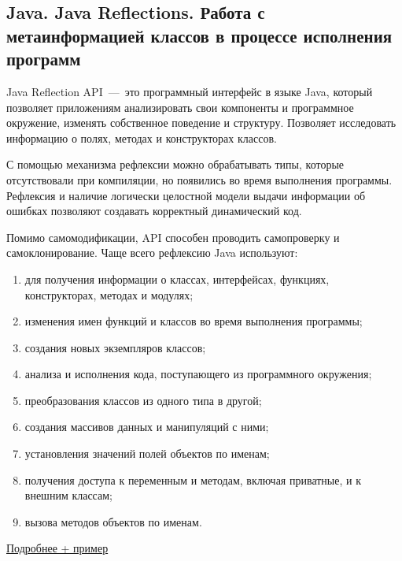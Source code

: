 \subsection{Java. Java Reflections. Работа с метаинформацией классов в процессе исполнения программ}

Java Reflection API~---~это программный интерфейс в языке Java, который позволяет приложениям анализировать свои компоненты и программное окружение, изменять собственное поведение и структуру. Позволяет исследовать информацию о полях, методах и конструкторах классов.

С помощью механизма рефлексии можно обрабатывать типы, которые отсутствовали при компиляции, но появились во время выполнения программы. Рефлексия и наличие логически целостной модели выдачи информации об ошибках позволяют создавать корректный динамический код. 

Помимо самомодификации, API способен проводить самопроверку и самоклонирование. Чаще всего рефлексию Java используют:
\begin{enumerate}
	\item для получения информации о классах, интерфейсах, функциях, конструкторах, методах и модулях;
	\item изменения имен функций и классов во время выполнения программы;
	\item создания новых экземпляров классов;
	\item анализа и исполнения кода, поступающего из программного окружения;
	\item преобразования классов из одного типа в другой;
	\item создания массивов данных и манипуляций с ними;
	\item установления значений полей объектов по именам;
	\item получения доступа к переменным и методам, включая приватные, и к внешним классам;
	\item вызова методов объектов по именам.
\end{enumerate}
\href{https://blog.skillfactory.ru/glossary/java-reflection-api/#:~:text=Java%20Reflection%20API%20%E2%80%94%20%D1%8D%D1%82%D0%BE%20%D0%BF%D1%80%D0%BE%D0%B3%D1%80%D0%B0%D0%BC%D0%BC%D0%BD%D1%8B%D0%B9,%D0%BF%D0%BE%D0%BB%D1%8F%D1%85%2C%20%D0%BC%D0%B5%D1%82%D0%BE%D0%B4%D0%B0%D1%85%20%D0%B8%20%D0%BA%D0%BE%D0%BD%D1%81%D1%82%D1%80%D1%83%D0%BA%D1%82%D0%BE%D1%80%D0%B0%D1%85%20%D0%BA%D0%BB%D0%B0%D1%81%D1%81%D0%BE%D0%B2.}{Подробнее + пример}